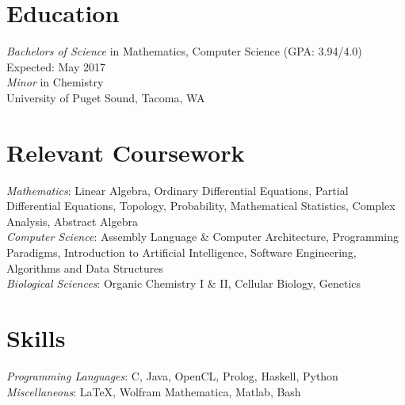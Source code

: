 \documentclass[letter]{res}
\begin{document}
\address{\texttt{https://mmore500.github.io}}
\address{541.740.6595, \texttt{mamoreno@pugetsound.edu}} 
\address{4029 Wheelock Student Center}
\address{Tacoma, Washington 98416}


\begin{resume}
\vspace{-2mm}
\section{Education}
{\sl Bachelors of Science} in Mathematics, Computer Science (GPA: 3.94/4.0) \hfill Expected: May 2017\\
{\sl Minor} in Chemistry \\
University of Puget Sound,  Tacoma, WA
  \vspace{-3.5mm}

\section{Relevant Coursework }
  {\sl Mathematics}: Linear Algebra, Ordinary Differential Equations, Partial Differential Equations, Topology, Probability, Mathematical Statistics, Complex Analysis, Abstract Algebra\\
  {\sl Computer Science}: Assembly Language \& Computer Architecture, Programming Paradigms, Introduction to Artificial Intelligence, Software Engineering, Algorithms and Data Structures \\
  {\sl Biological Sciences}: Organic Chemistry I \& II, Cellular Biology, Genetics
\vspace{-3.5mm}

 \section{Skills}
  {\sl Programming Languages}: C, Java, OpenCL, Prolog, Haskell, Python \\
  {\sl Miscellaneous}: \LaTeX, Wolfram Mathematica, Matlab, Bash
\vspace{-3.5mm}


\end{resume}
\end{document}
